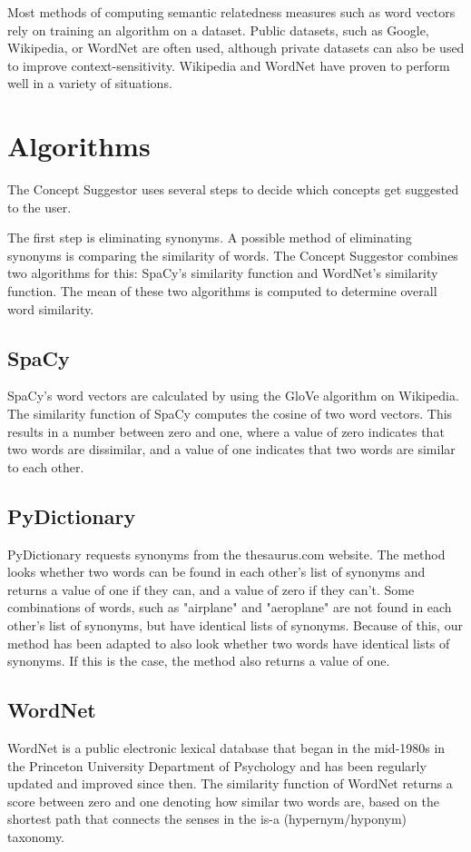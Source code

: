 \documentclass{article}
\begin{document}
Most methods of computing semantic relatedness measures such as word vectors rely on training an algorithm on a dataset. Public datasets, such as Google, Wikipedia, or WordNet are often used, although private datasets can also be used to improve context-sensitivity. Wikipedia and WordNet have proven to perform well in a variety of situations.\cite{strube2006wikirelate}

\section{Algorithms}

The Concept Suggestor uses several steps to decide which concepts get suggested to the user.

The first step is eliminating synonyms. A possible method of eliminating synonyms is comparing the similarity of words. The Concept Suggestor combines two algorithms for this: SpaCy's similarity function and WordNet's similarity function. The mean of these two algorithms is computed to determine overall word similarity.

\subsection{SpaCy}
SpaCy's word vectors are calculated by using the GloVe algorithm on Wikipedia. The similarity function of SpaCy computes the cosine of two word vectors. This results in a number between zero and one, where a value of zero indicates that two words are dissimilar, and a value of one indicates that two words are similar to each other.

\subsection{PyDictionary}
PyDictionary requests synonyms from the thesaurus.com website. The method looks whether two words can be found in each other's list of synonyms and returns a value of one if they can, and a value of zero if they can't. Some combinations of words, such as "airplane" and "aeroplane" are not found in each other's list of synonyms, but have identical lists of synonyms. Because of this, our method has been adapted to also look whether two words have identical lists of synonyms. If this is the case, the method also returns a value of one.

\subsection{WordNet}
WordNet is a public electronic lexical database that began in the mid-1980s in the Princeton University Department of Psychology and has been regularly updated and improved since then. The similarity function of WordNet returns a score between zero and one denoting how similar two words are, based on the shortest path that connects the senses in the is-a (hypernym/hyponym) taxonomy. %
\end{document}
